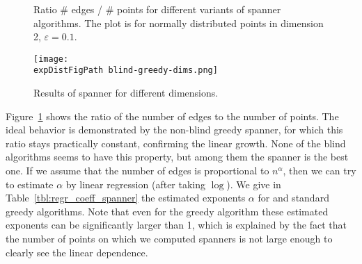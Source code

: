 \documentclass{ws-ijcga}
\newcommand{\eps}{\varepsilon}
\def \expDistFigPath {pics/}
\def \expDistDataPath {./}
\begin{document}
\begin{figure}[!htbp]
            \caption{Ratio \# edges / \# points for different variants of spanner 
            algorithms. The plot is for normally distributed points
            in dimension 2, $\eps = 0.1$.}
            \label{fig:spanner_ratio}
\end{figure}

\begin{figure}[ht!]
    \begin{centering}
    \texttt{[image: \\expDistFigPath blind-greedy-dims.png]}
    \caption{Results of \bgrdy spanner for different dimensions.}
    \label{fig:blind_greedy_dimensions}
    \end{centering}
\end{figure}


Figure~\ref{fig:spanner_ratio} shows the ratio of the number of edges to the number of points.
The ideal behavior is demonstrated by the non-blind greedy spanner,
for which this ratio stays practically constant, confirming the linear growth.
None of the blind algorithms seems to have this property, but among them
the \bgrdy spanner is the best one. If we assume that the number of edges
is proportional to $n^\alpha$, then we can try to estimate $\alpha$ by 
linear regression (after taking $\log$).  We give in Table~\ref{tbl:regr_coeff_spanner}
the estimated exponents $\alpha$ for \bgrdy and standard
greedy algorithms. Note that even for the greedy algorithm these estimated
exponents can be significantly larger than 1,
which is explained by the fact that the number of points
on which we computed spanners is not large enough to clearly see
the linear dependence.
\end{document}
